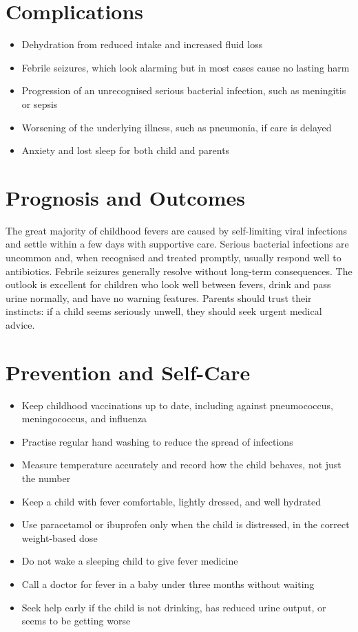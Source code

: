 \section*{Complications}
\begin{itemize}
    \item Dehydration from reduced intake and increased fluid loss
    \item Febrile seizures, which look alarming but in most cases cause no lasting harm
    \item Progression of an unrecognised serious bacterial infection, such as meningitis or sepsis
    \item Worsening of the underlying illness, such as pneumonia, if care is delayed
    \item Anxiety and lost sleep for both child and parents
\end{itemize}

\section*{Prognosis and Outcomes}
The great majority of childhood fevers are caused by self-limiting viral infections and settle within a few days with supportive care. Serious bacterial infections are uncommon and, when recognised and treated promptly, usually respond well to antibiotics. Febrile seizures generally resolve without long-term consequences. The outlook is excellent for children who look well between fevers, drink and pass urine normally, and have no warning features. Parents should trust their instincts: if a child seems seriously unwell, they should seek urgent medical advice.

\section*{Prevention and Self-Care}
\begin{itemize}
    \item Keep childhood vaccinations up to date, including against pneumococcus, meningococcus, and influenza
    \item Practise regular hand washing to reduce the spread of infections
    \item Measure temperature accurately and record how the child behaves, not just the number
    \item Keep a child with fever comfortable, lightly dressed, and well hydrated
    \item Use paracetamol or ibuprofen only when the child is distressed, in the correct weight-based dose
    \item Do not wake a sleeping child to give fever medicine
    \item Call a doctor for fever in a baby under three months without waiting
    \item Seek help early if the child is not drinking, has reduced urine output, or seems to be getting worse
\end{itemize}

